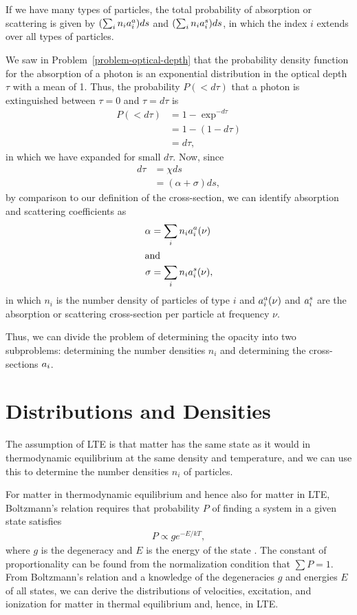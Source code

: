 If we have many types of particles, the total probability of absorption or scattering is given by $(\sum_i n_i a^a_i)ds$ and $(\sum_i n_i a^s_i)ds$,  in which the index $i$ extends over all types of
particles. 

\newslide

We saw in Problem~\ref{problem-optical-depth} that the probability density function for the absorption of a photon is an exponential distribution in the optical depth $\tau$ with a mean of 1. Thus, the probability $P(<d\tau)$ that a photon is extinguished between $\tau = 0$ and $\tau = d\tau$ is
\begin{align}
P(<d\tau) &= 1 - \exp^{-d\tau}\\
&= 1 - (1 - {d\tau})\\
&= {d\tau},
\end{align}
in which we have expanded for small $d\tau$.
Now, since
\begin{align}
d\tau &= \chi ds\\
&= (\alpha + \sigma) ds,
\end{align}
by comparison to our definition of the cross-section, 
we can identify absorption and scattering coefficients as
\begin{align}
\alpha &= \sum_i n_i a^a_i(\nu)\\
\intertext{and}
\sigma &= \sum_i n_i a^s_i(\nu),
\end{align}
in which $n_i$ is the number density of particles of type $i$ and
$a^a_i(\nu)$ and $a^s_i$ are the absorption or scattering cross-section per
particle at frequency $\nu$.

Thus, we can divide the problem of determining the opacity
into two subproblems: determining the number densities $n_i$ and determining
the cross-sections $a_i$.

\newslide

\section{Distributions and Densities}

The assumption of LTE is that matter has the same state as it would in
thermodynamic equilibrium at the same density and temperature, and we can use this to determine the number densities $n_i$ of particles. 

For matter in thermodynamic equilibrium and hence also for matter in LTE,
Boltzmann's relation requires that
probability $P$ of finding a system in a given state satisfies
\begin{align}
P \propto g e^{-E/kT},
\end{align}
where $g$ is the degeneracy and $E$ is the energy of the state
\citep[pp.\ 201--203]{Reif-1965}. The constant of
proportionality can be found from the normalization condition that $\sum
P = 1$. From Boltzmann's relation and a knowledge of the degeneracies $g$
and energies $E$ of all states, we can derive the distributions of
velocities, excitation, and ionization for matter in thermal equilibrium
and, hence, in LTE.

